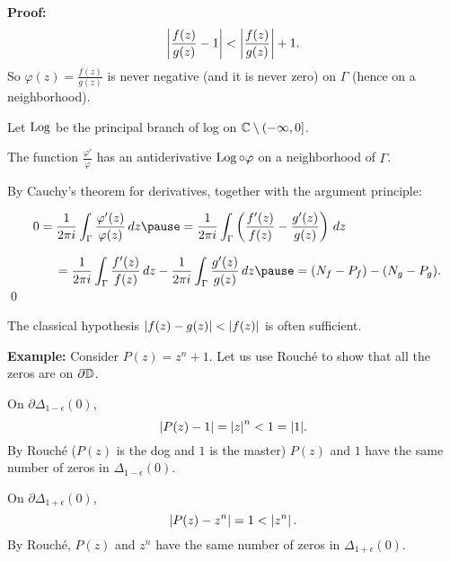 \documentclass[10pt,aspectratio=169]{beamer}
\begin{document}
\begin{frame}
\textbf{Proof:}
\begin{equation*}
\left\lvert {\frac{f(z)}{g(z)} - 1} \right\rvert <
\left\lvert {\frac{f(z)}{g(z)}} \right\rvert + 1 .
\end{equation*}
\pause
So
$\varphi(z) = \frac{f(z)}{g(z)}$ is never negative (and it is never zero) on
$\Gamma$ (hence on a neighborhood).

\pause
\medskip

Let $\operatorname{Log}$ be the principal branch of log on ${\mathbb{C}} \setminus (-\infty,0]$.

\pause
\medskip

The function
$\frac{\varphi'}{\varphi}$ has an antiderivative $\operatorname{Log} \circ \varphi$ on a neighborhood of $\Gamma$.

\pause
\medskip

By Cauchy's theorem for derivatives,
together with the argument principle:

\medskip

$
\displaystyle
\qquad
0
= \frac{1}{2\pi i} \int_{\Gamma} \frac{\varphi'(z)}{\varphi(z)} \, dz
\pause
=
\frac{1}{2\pi i} \int_{\Gamma}
\left( \frac{f'(z)}{f(z)} - \frac{g'(z)}{g(z)} \right) \, dz 
$

\medskip
\pause

$\displaystyle
\qquad\qquad
=
\frac{1}{2\pi i} \int_{\Gamma}
\frac{f'(z)}{f(z)} \, dz 
-
\frac{1}{2\pi i} \int_{\Gamma}
\frac{g'(z)}{g(z)} \, dz 
\pause
=
(N_f - P_f) - (N_g - P_g) .
\quad
$
\qed
\end{frame}

\begin{frame}
The classical hypothesis $\lvert {f(z)-g(z)} \rvert < \lvert {f(z)} \rvert$ is often
sufficient.

\medskip
\pause

\textbf{Example:}
Consider $P(z) = z^n + 1$.
Let us use Rouch\'e to show that all the zeros are on $\partial {\mathbb{D}}$.

\medskip
\pause

On $\partial \Delta_{1-\epsilon}(0)$,
\[
\left\lvert {P(z) - 1} \right\rvert = \left\lvert {z} \right\rvert^n < 1 = \lvert {1} \rvert.
\]
\pause
By Rouch\'e ($P(z)$ is the dog and $1$ is the master)
$P(z)$ and $1$ have the same number of zeros in 
$\Delta_{1-\epsilon}(0)$.

\medskip
\pause

On $\partial \Delta_{1+\epsilon}(0)$,
\begin{equation*}
\left\lvert {P(z) - z^n} \right\rvert = 1 < \left\lvert {z^n} \right\rvert .
\end{equation*}
By Rouch\'e,
$P(z)$ and $z^n$ have the same number of zeros in 
$\Delta_{1+\epsilon}(0)$.
\end{frame}
\end{document}
